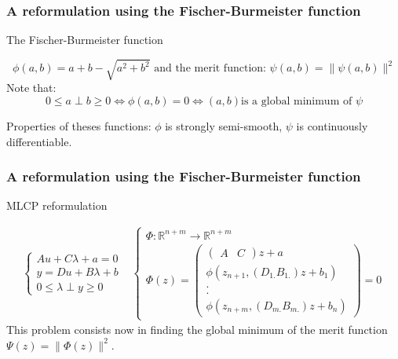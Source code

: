 
\frame
{
\frametitle{A reformulation using the Fischer-Burmeister function}
\begin{block}{ The Fischer-Burmeister function}
 
\[\phi (a,b) = a+b-\sqrt{a^2+b^2} \textrm{ and the merit function: } \psi (a,b) = \| \psi(a,b)\|^2 \]
Note that:
\[  0 \le a \perp     b   \ge 0 \Longleftrightarrow \phi (a,b) =0 \Longleftrightarrow (a,b) \textrm{is a
global minimum of } \psi \]
\end{block}

 Properties of theses functions: $\phi$ is strongly semi-smooth, $\psi$ is continuously differentiable.

\begin{figure}[h]
\centerline{
 \scalebox{0.35}{
    
    
 }
}
\end{figure}

 

}

\frame
{
\frametitle{A reformulation using the Fischer-Burmeister function}


\begin{block}{ MLCP reformulation}

\begin{equation}
  \begin{array}{cc}
   \begin{cases}
    A u + C \lambda + a =0 \\
    y=Du +B \lambda +b\\
    {0} \le \lambda \perp     y   \ge {0}
    \end{cases}&
   \begin{cases}
   \Phi :\mathbb{R}^{n+m} \longrightarrow \mathbb{R}^{n+m}\\
   \Phi(z)=\left(\begin{array}{c}
   \left(\begin{array}{cc}
   A&C
   \end{array}\right)z+a\\
   \phi(z_{n+1},(D_{1.}B_{1.})z+b_1)\\
   .\\
   .\\
   \phi(z_{n+m},(D_{m.}B_{m.})z+b_n)
   \end{array}\right)=0
    \end{cases}
  \end{array}
\end{equation}
This problem consists now in finding the global minimum of the merit function $\Psi(z)=\| \Phi(z)\|^2$.
 
\end{block}


}


